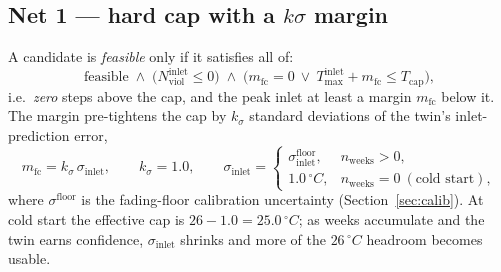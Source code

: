 \documentclass[11pt]{article}
\newcommand{\degC}{\ensuremath{^{\circ}}C}
\newcommand{\Tcap}{T_{\mathrm{cap}}}
\begin{document}
\subsection{Net 1 --- hard cap with a \texorpdfstring{$k\sigma$}{k-sigma} margin}
A candidate is \emph{feasible} only if it satisfies all of:
\begin{equation}
\text{feasible} \;\wedge\;
\big(N^{\mathrm{inlet}}_{\mathrm{viol}} \le 0\big) \;\wedge\;
\big(m_{\mathrm{fc}}=0 \ \lor\ T^{\mathrm{inlet}}_{\max}+m_{\mathrm{fc}} \le \Tcap\big),
\label{eq:feasible}
\end{equation}
i.e.\ \emph{zero} steps above the cap, and the peak inlet at least a margin
\(m_{\mathrm{fc}}\) below it. The margin pre-tightens the cap by \(k_\sigma\) standard
deviations of the twin's inlet-prediction error,
\begin{equation}
m_{\mathrm{fc}} = k_\sigma\,\sigma_{\mathrm{inlet}},
\qquad k_\sigma = 1.0,
\qquad
\sigma_{\mathrm{inlet}} =
\begin{cases}
\sigma^{\mathrm{floor}}_{\mathrm{inlet}}, & n_{\mathrm{weeks}}>0,\\[3pt]
1.0\,\degC, & n_{\mathrm{weeks}}=0 \ (\text{cold start}),
\end{cases}
\label{eq:margin}
\end{equation}
where \(\sigma^{\mathrm{floor}}\) is the fading-floor calibration uncertainty
(Section~\ref{sec:calib}). At cold start the effective cap is \(26-1.0 = 25.0\,\degC\); as
weeks accumulate and the twin earns confidence, \(\sigma_{\mathrm{inlet}}\) shrinks and
more of the \(26\,\degC\) headroom becomes usable.
\end{document}
